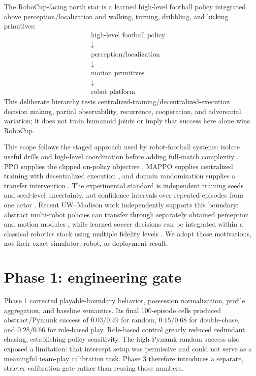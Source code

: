 \documentclass[12pt,twocolumn]{article}
\begin{document}
The RoboCup-facing north star is a learned high-level football policy integrated above
perception/localization and walking, turning, dribbling, and kicking primitives:
\[
\begin{gathered}
\text{high-level football policy}\\[-0.2em]
\downarrow\\[-0.2em]
\text{perception/localization}\\[-0.2em]
\downarrow\\[-0.2em]
\text{motion primitives}\\[-0.2em]
\downarrow\\[-0.2em]
\text{robot platform}
\end{gathered}
\]
This deliberate hierarchy tests centralized-training/decentralized-execution decision making,
partial observability, recurrence, cooperation, and adversarial variation; it does not train
humanoid joints or imply that success here alone wins RoboCup.

This scope follows the staged approach used by robot-football systems: isolate useful drills and
high-level coordination before adding full-match complexity \cite{liu2022teamplay,kurach2020football,
su2025quadruped}. PPO supplies the clipped on-policy objective \cite{schulman2017ppo}, MAPPO supplies
centralized training with decentralized execution \cite{yu2022mappo}, and domain randomization
supplies a transfer intervention \cite{tobin2017domain,mehta2020active}. The experimental standard
is independent training seeds and seed-level uncertainty, not confidence intervals over repeated
episodes from one actor \cite{agarwal2021precipice}.
Recent UW--Madison work independently supports this boundary: abstract multi-robot policies can
transfer through separately obtained perception and motion modules \cite{labiosa2025abstract},
while learned soccer decisions can be integrated within a classical robotics stack using multiple
fidelity levels \cite{labiosa2025stack}. We adopt those motivations, not their exact simulator,
robot, or deployment result.

\section{Phase 1: engineering gate}
Phase 1 corrected playable-boundary behavior, possession normalization, profile aggregation, and
baseline semantics. Its final 100-episode cells produced abstract/Pymunk success of
$0.03/0.49$ for random, $0.15/0.68$ for double-chase, and $0.28/0.66$ for role-based play.
Role-based control greatly reduced redundant chasing, establishing policy sensitivity. The high
Pymunk random success also exposed a limitation: that intercept setup was permissive and could not
serve as a meaningful team-play calibration task. Phase 3 therefore introduces a separate,
stricter calibration gate rather than reusing those numbers.
\end{document}
